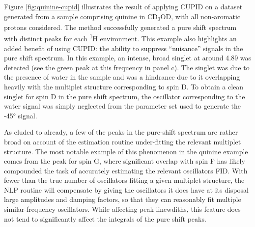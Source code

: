Figure \ref{fig:quinine-cupid} illustrates the result of applying \ac{CUPID} on
a dataset generated from a sample comprising quinine in CD\textsubscript{3}OD,
with all non-aromatic protons considered. The method successfully generated a
pure shift spectrum with distinct peaks for each \textsuperscript{1}H
environment. This example also highlights an added benefit of using \ac{CUPID}:
the ability to suppress ``nuisance'' signals in the pure shift spectrum. In this
example, an intense, broad singlet at around \qty{4.89}{\partspermillion}
was detected (see the green peak at this frequency in panel c).
The singlet was due to the presence of water in the sample and was a hindrance
due to it overlapping heavily with the multiplet structure corresponding to
spin D. To obtain a clean singlet for spin D in the pure shift spectrum, the
oscillator corresponding to the water signal was simply neglected from
the parameter set used to
generate the \ang{-45} signal. 

As eluded to already, a few of the peaks in the pure-shift spectrum are rather
broad on account of the estimation routine under-fitting the relevant multiplet
structure. The most notable example of this phenomenon in the quinine example
comes from the peak for spin G, where significant overlap with spin F has likely
compounded the task of accurately estimating the relevant oscillators \ac{FID}. With fewer than the
true number of oscillators fitting a given multiplet structure, the \ac{NLP}
routine will compensate by giving the oscillators it does have at its disposal
large amplitudes and damping factors, so that they can reasonably fit multiple
similar-frequency oscillators.
While affecting peak linewdiths, this feature does not tend to significantly
affect the integrals of the pure shift peaks. 

